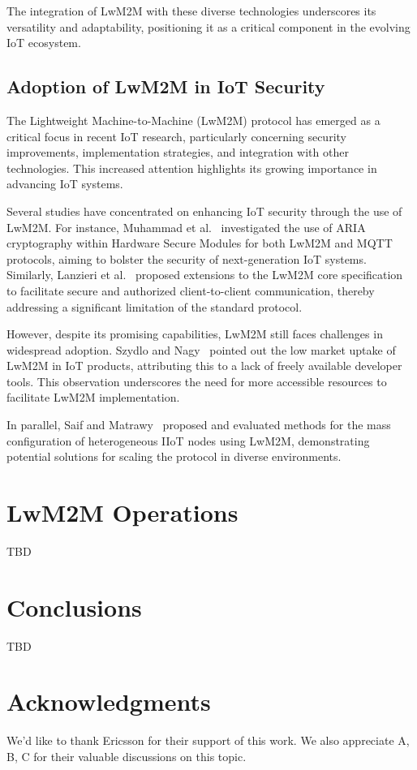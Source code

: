 \documentclass[11pt,sigconf]{iabart}
\begin{document}
The integration of LwM2M with these diverse technologies underscores its versatility and adaptability, positioning it as a critical component in the evolving IoT ecosystem.

\subsection{ Adoption of LwM2M in IoT Security}

The Lightweight Machine-to-Machine (LwM2M) protocol has emerged as a critical focus in recent IoT research, particularly concerning security improvements, implementation strategies, and integration with other technologies. This increased attention highlights its growing importance in advancing IoT systems.

Several studies have concentrated on enhancing IoT security through the use of LwM2M. For instance, Muhammad et al.~\cite{pop00001} investigated the use of ARIA cryptography within Hardware Secure Modules for both LwM2M and MQTT protocols, aiming to bolster the security of next-generation IoT systems. Similarly, Lanzieri et al.~\cite{pop00011} proposed extensions to the LwM2M core specification to facilitate secure and authorized client-to-client communication, thereby addressing a significant limitation of the standard protocol.

However, despite its promising capabilities, LwM2M still faces challenges in widespread adoption. Szydlo and Nagy~\cite{pop00003} pointed out the low market uptake of LwM2M in IoT products, attributing this to a lack of freely available developer tools. This observation underscores the need for more accessible resources to facilitate LwM2M implementation.

In parallel, Saif and Matrawy~\cite{pop00005} proposed and evaluated methods for the mass configuration of heterogeneous IIoT nodes using LwM2M, demonstrating potential solutions for scaling the protocol in diverse environments.

\section{LwM2M Operations} \label{operations}



TBD


\section{Conclusions} \label{conclusions}

TBD

\section{Acknowledgments}

We'd like to thank Ericsson for their support of this work. We also appreciate A, B, C for their valuable discussions on this topic.



\end{document}
